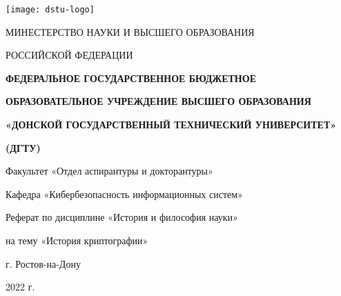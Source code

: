 \begin{titlepage}
	\centerline{\texttt{[image: dstu-logo]}}
	\vfill
	\centerline{МИНЕСТЕРСТВО НАУКИ И ВЫСШЕГО ОБРАЗОВАНИЯ}
	\centerline{РОССИЙСКОЙ ФЕДЕРАЦИИ}
	\vfill
	\centerline{\bf ФЕДЕРАЛЬНОЕ ГОСУДАРСТВЕННОЕ БЮДЖЕТНОЕ}
	\centerline{\bf ОБРАЗОВАТЕЛЬНОЕ УЧРЕЖДЕНИЕ ВЫСШЕГО ОБРАЗОВАНИЯ}
	\centerline{\bf «ДОНСКОЙ ГОСУДАРСТВЕННЫЙ ТЕХНИЧЕСКИЙ УНИВЕРСИТЕТ»}
	\centerline{\bf (ДГТУ)}
	\normalsize
	\vfill\vfill
	\centerline{Факультет «Отдел аспирантуры и докторантуры»}
	\centerline{Кафедра «Кибербезопасность информационных систем»}
	\vfill
	\vfill
	\centerline{Реферат по дисциплине «История и философия науки»}
	\centerline{на тему «История криптографии»}
	\vfill
	\vfill
	\vfill
	\vfill
	\vfill
	\vfill
	\vfill
	\vfill
	\vfill
	
	\centerline{г. Ростов-на-Дону}
	\centerline{2022 г.}
	
\end{titlepage}
\setcounter{page}{2}